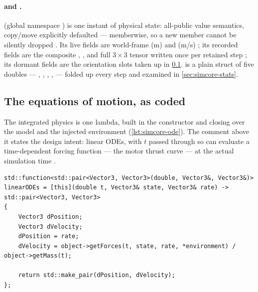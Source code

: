 \paragraph{ and .}  (global
namespace ) is one instant of physical state: all-public value
semantics, copy/move explicitly defaulted --- memberwise, so a new member cannot be silently
dropped . Its live fields are world-frame  (m) and
 (m/s) ; its recorded fields are the composite
, , and full $3\times 3$  tensor written once per retained
step ; its dormant fields are the orientation slots taken up in
\cref{sec:simcore-ode}.  is a plain struct of five doubles --- ,
, , , 
 --- folded up every step and examined in
\cref{sec:simcore-stats}.

\subsection{The equations of motion, as coded}\label{sec:simcore-ode}

The integrated physics is one lambda, built in the  constructor and closing over
the model and the injected environment (\cref{lst:simcore-ode}). The comment above it states the
design intent: linear ODEs, with $t$ passed through so  can evaluate a
time-dependent forcing function --- the motor thrust curve --- at the actual simulation time
.

\begin{listing}[htbp]
\begin{verbatim}
std::function<std::pair<Vector3, Vector3>(double, Vector3&, Vector3&)> linearODEs = [this](double t, Vector3& state, Vector3& rate) -> std::pair<Vector3, Vector3>
{
    Vector3 dPosition;
    Vector3 dVelocity;
    dPosition = rate;
    dVelocity = object->getForces(t, state, rate, *environment) / object->getMass(t);

    return std::make_pair(dPosition, dVelocity);
};
\end{verbatim}
\caption{The integrated physics in its entirety : one lambda
closing over the model and the environment. Everything the solvers ever learn about rockets
passes through this pair of derivatives.}\label{lst:simcore-ode}
\end{listing}

